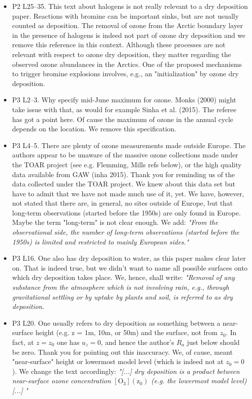 \documentclass{scrartcl}
\begin{document}
\begin{itemize}
\item {\color{blue}P2 L25--35. This text about halogens is not really relevant to a dry deposition
paper. Reactions with bromine can be important sinks, but are not usually counted
as deposition.}
  The removal of ozone from the Arctic boundary layer in the presence of halogens is indeed not part of ozone dry deposition and we remove this reference in this context.
Although these processes are not relevant with respect to ozone dry deposition, they matter regarding the observed ozone abundances in the Arctics. One of the proposed mechanisms to trigger bromine explosions involves, e.g., an "initialization" by ozone dry deposition.  
\item {\color{blue}P3 L2--3. Why specify mid-June maximum for ozone. Monks (2000) might
  take issue with that, as would for example Sinha et al. (2015).}
  The referee has got a point here. Of cause the maximum of ozone in the annual cycle depends on the location. We remove this specification.
\item {\color{blue}P3 L4--5. There are plenty of ozone measurements made outside Europe. The
authors appear to be unaware of the massive ozone collections made under the
TOAR project (see e.g. Flemming, Mills refs below), or the high quality data
available from GAW (inha 2015).}
  Thank you for reminding us of the data collected under the TOAR project. We knew about this data set but have to admit that we have not made much use of it, yet. We have, however, not stated that there are, in general, no sites outside of Europe, but that long-term observations (started before the 1950s) are only found in Europe. Maybe the term "long-term" is not clear enough. We add: \emph{"From the observational side, the number of long-term observations (started before the 1950s) is limited and restricted to mainly European sides."}
  
\item {\color{blue}P3 L16. One also has dry deposition to water, as this paper makes clear later on.}
  That is indeed true, but we didn't want to name all possible surfaces onto which dry deposition takes place. We, hence, shall write: \emph{"Removal of any substance from the atmosphere which is not involving rain, e.g., through gravitational settling or by uptake by plants and soil, is referred to as dry deposition.}
  
\item {\color{blue}P3 L20. One usually refers to dry deposition as something between a near-
surface height (e.g. z = 1m, 10m, or 50m) and the surface, not from $z_0$. In fact,
at $z = z_0$ one has $u_z = 0$, and hence the author’s $R_a$ just below should be zero.}
Thank you for pointing out this inaccuracy. We, of cause, meant "near-surface" height or lowermost model level (which is indeed not at $z_0=0$). We change the text accordingly: \emph{"[...] dry deposition is a product between near-surface ozone concentration $\mathrm{[O_3](z_0)}$ (e.g. the lowermost model level) [...] "}
  

\end{itemize}
\end{document}
